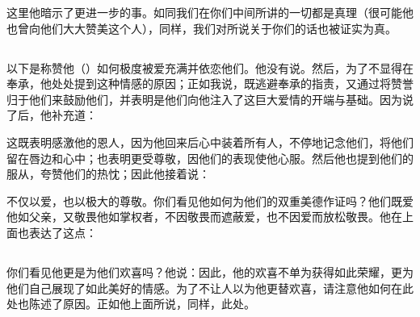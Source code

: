 这里他暗示了更进一步的事。如同我们在你们中间所讲的一切都是真理（很可能他也曾向他们大大赞美这个人），同样，我们对所说关于你们的话也被证实为真。\par


\subsection{}

\par

以下是称赞他（）如何极度被爱充满并依恋他们。他没有说。然后，为了不显得在奉承，他处处提到这种情感的原因；正如我说，既逃避奉承的指责，又通过将赞誉归于他们来鼓励他们，并表明是他们向他注入了这巨大爱情的开端与基础。因为说了后，他补充道：\par

这既表明感激他的恩人，因为他回来后心中装着所有人，不停地记念他们，将他们留在唇边和心中；也表明更受尊敬，因他们的表现使他心服。然后他也提到他们的服从，夸赞他们的热忱；因此他接着说：\par

不仅以爱，也以极大的尊敬。你们看见他如何为他们的双重美德作证吗？他们既爱他如父亲，又敬畏他如掌权者，不因敬畏而遮蔽爱，也不因爱而放松敬畏。他在上面也表达了这点：\par


\subsection{}

你们看见他更是为他们欢喜吗？他说：因此，他的欢喜不单为获得如此荣耀，更为他们自己展现了如此美好的情感。为了不让人以为他更替欢喜，请注意他如何在此处也陈述了原因。正如他上面所说，同样，此处。\par

